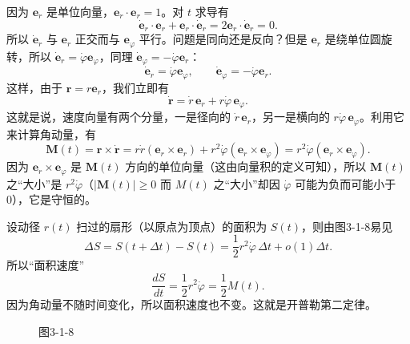 因为 $\boldsymbol e_r$ 是单位向量，$\boldsymbol e_r\cdot\boldsymbol e_r=1$。对 $t$ 求导有
\[
 \dot{\boldsymbol e}_r\cdot\boldsymbol e_r+\boldsymbol e_r\cdot\dot{\boldsymbol e}_r=2\boldsymbol e_r\cdot\dot{\boldsymbol e}_r=0.
\]
所以 $\dot{\boldsymbol e}_r$ 与 $\boldsymbol e_r$ 正交而与 $\boldsymbol e_\varphi$ 平行。问题是同向还是反向？但是 $\boldsymbol e_r$ 是绕单位圆旋转，所以 $\dot{\boldsymbol e}_r=\dot\varphi\boldsymbol e_\varphi$，同理 $\dot{\boldsymbol e}_\varphi=-\dot\varphi\boldsymbol e_r$：
\begin{equation}
 \dot{\boldsymbol e}_r=\dot\varphi\boldsymbol e_\varphi,\qquad
 \dot{\boldsymbol e}_\varphi=-\dot\varphi\boldsymbol e_r.
 \tag{19}
\end{equation}
这样，由于 $\boldsymbol r=r\boldsymbol e_r$，我们立即有
\begin{equation}
 \dot{\boldsymbol r}=\dot r\,\boldsymbol e_r+r\dot\varphi\,\boldsymbol e_\varphi.
 \tag{20}
\end{equation}
这就是说，速度向量有两个分量，一是径向的 $\dot r\,\boldsymbol e_r$，另一是横向的 $r\dot\varphi\,\boldsymbol e_\varphi$。利用它来计算角动量，有
\[
 \boldsymbol M(t)=\boldsymbol r\times\dot{\boldsymbol r}
 =r\dot r(\boldsymbol e_r\times\boldsymbol e_r)+r^2\dot\varphi(\boldsymbol e_r\times\boldsymbol e_\varphi)
 =r^2\dot\varphi(\boldsymbol e_r\times\boldsymbol e_\varphi).
\]
因为 $\boldsymbol e_r\times\boldsymbol e_\varphi$ 是 $\boldsymbol M(t)$ 方向的单位向量（这由向量积的定义可知），所以 $\boldsymbol M(t)$ 之“大小”是 $r^2\dot\varphi$（$|\boldsymbol M(t)|\ge0$ 而 $M(t)$ 之“大小”却因 $\dot\varphi$ 可能为负而可能小于0），它是守恒的。

设动径 $r(t)$ 扫过的扇形（以原点为顶点）的面积为 $S(t)$，则由图3-1-8易见
\[
 \Delta S=S(t+\Delta t)-S(t)=\frac12r^2\dot\varphi\,\Delta t+o(1)\Delta t.
\]
所以“面积速度”
\[
 \frac{dS}{dt}=\frac12r^2\dot\varphi=\frac12M(t).
\]
因为角动量不随时间变化，所以面积速度也不变。这就是开普勒第二定律。

\begin{figure}[htbp]
\centering
{}
\caption*{图3-1-8}
\end{figure}

